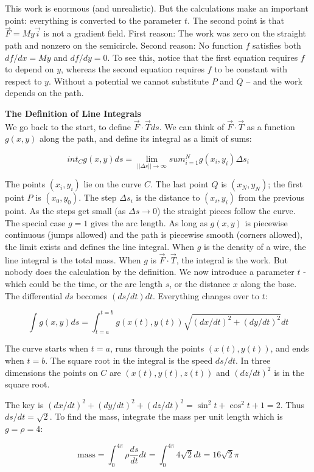 This work is enormous (and unrealistic). But the calculations make an important
point: everything is converted to the parameter $t$. The second point is that $\vec F = My \vec i$
is not a gradient field. First reason: The work was zero on the straight path and 
nonzero on the semicircle. Second reason: No function $f$ satisfies both $df/ dx = My$ and $df /dy =
0$. To see this, notice that the first equation requires $f$ to depend on $y$, whereas the second equation requires $f$ to be constant with respect to $y$. Without a potential we cannot substitute $P$ and $Q$ -- and the work depends
on the path.

\noindent\textbf{\large The Definition of Line Integrals}\\

We go back to the start, to define $\vec F \cdot \vec T ds$. We can think of $\vec F \cdot \vec T$ as a function $g(x, y)$
along the path, and define its integral as a limit of sums:

\begin{definition}
 $$int_C g(x,y)ds = \lim_{||\Delta s||\to\infty} sum_{i=1}^N g(x_i,y_i)\Delta s_i$$
\end{definition}

The points $(x_i, y_i)$ lie on the curve $C$. The last point $Q$ is $(x_N, y_N)$; the first point $P$ is
$(x_0, y_0)$. The step $\Delta s_i$ is the distance to $(x_i, y_i)$ from the previous point. As the steps
get small (as $\Delta s \to 0$) the straight pieces follow the curve. The
special case $g = 1$ gives the arc length. As long as $g(x, y)$ is piecewise continuous
(jumps allowed) and the path is piecewise smooth (corners allowed), the limit exists
and defines the line integral.
When $g$ is the density of a wire, the line integral is the total mass. When $g$ is $\vec F \cdot \vec T$,
the integral is the work. But nobody does the calculation by the definition. We now
introduce a parameter $t$ - which could be the time, or the arc length $s$, or the distance
$x$ along the base.
The differential $ds$ becomes $(ds/dt)dt$. Everything changes over to $t$:

$$\int g(x,y)ds=\int_{t=a}^{t=b}g(x(t),y(t))\sqrt{(dx/dt)^2+(dy/dt)^2}dt$$

The curve starts when $t = a$, runs through the points $(x(t), y(t))$, and ends when $t = b$.
The square root in the integral is the speed $ds/dt$. In three dimensions the points on
$C$ are $(x(t), y(t), z(t))$ and $(dz/dt)^2$ is in the square root.

{The key is $(dx/dt)^2 + (dy/dt)^2 + (dz/dt)^2 = \sin^2 t + \cos^2 t + 1 = 2$. Thus
$ds/dt = \sqrt{2}$. To find the mass, integrate the mass per unit length which is $g = \rho = 4$:

$$\text{mass}=\int_0^{4\pi}\rho \dfrac{ds}{dt}dt=\int_0^{4\pi}4\sqrt{2}dt=16\sqrt{2}\pi$$}

